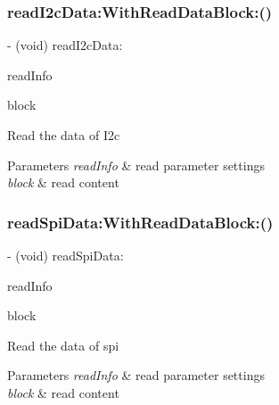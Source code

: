 \subsubsection{\texorpdfstring{read\+I2c\+Data\+:\+With\+Read\+Data\+Block\+:()}{readI2cData:WithReadDataBlock:()}}
{\footnotesize\ttfamily -\/ (void) read\+I2c\+Data\+: \begin{DoxyParamCaption}\item[{(\hyperlink{struct_p_v_s_d_k___m_o_u_n_t_a_p_i___r_e_a_d_i2_c___d_a_t_a}{P\+V\+S\+D\+K\+\_\+\+M\+O\+U\+N\+T\+A\+P\+I\+\_\+\+R\+E\+A\+D\+I2\+C\+\_\+\+D\+A\+TA})}]{read\+Info }\item[{WithReadDataBlock:(P\+V\+S\+D\+K\+Read\+I2c\+Data\+Block)}]{block }\end{DoxyParamCaption}}

Read the data of I2c


\begin{DoxyParams}{Parameters}
{\em read\+Info} & read parameter settings \\
\hline
{\em block} & read content \\
\hline
\end{DoxyParams}
\mbox{\label{interface_p_v_mount_controller_ad8b9eaddc70538943db4cb59fda3593b}} 
\subsubsection{\texorpdfstring{read\+Spi\+Data\+:\+With\+Read\+Data\+Block\+:()}{readSpiData:WithReadDataBlock:()}}
{\footnotesize\ttfamily -\/ (void) read\+Spi\+Data\+: \begin{DoxyParamCaption}\item[{(\hyperlink{struct_p_v_s_d_k___m_o_u_n_t_a_p_i___r_e_a_d_s_p_i___d_a_t_a}{P\+V\+S\+D\+K\+\_\+\+M\+O\+U\+N\+T\+A\+P\+I\+\_\+\+R\+E\+A\+D\+S\+P\+I\+\_\+\+D\+A\+TA})}]{read\+Info }\item[{WithReadDataBlock:(P\+V\+S\+D\+K\+Read\+Spi\+Data\+Block)}]{block }\end{DoxyParamCaption}}

Read the data of spi


\begin{DoxyParams}{Parameters}
{\em read\+Info} & read parameter settings \\
\hline
{\em block} & read content \\
\hline
\end{DoxyParams}
\mbox{\label{interface_p_v_mount_controller_a029b6d7c818f6f96f438be8aa473c09f}} 
